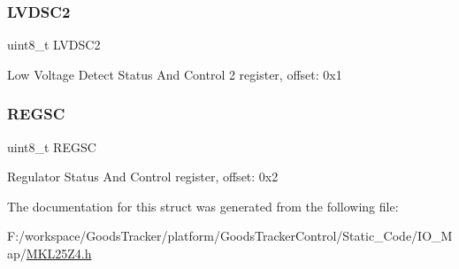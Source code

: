 \subsubsection{\texorpdfstring{L\+V\+D\+S\+C2}{LVDSC2}}
{\footnotesize\ttfamily uint8\+\_\+t L\+V\+D\+S\+C2}

Low Voltage Detect Status And Control 2 register, offset\+: 0x1 \mbox{\label{struct_p_m_c___mem_map_a9786fdb50c1bad04aedb8b090e2eaddf}} 
\subsubsection{\texorpdfstring{R\+E\+G\+SC}{REGSC}}
{\footnotesize\ttfamily uint8\+\_\+t R\+E\+G\+SC}

Regulator Status And Control register, offset\+: 0x2 

The documentation for this struct was generated from the following file\+:\begin{DoxyCompactItemize}
\item 
F\+:/workspace/\+Goods\+Tracker/platform/\+Goods\+Tracker\+Control/\+Static\+\_\+\+Code/\+I\+O\+\_\+\+Map/\hyperlink{_m_k_l25_z4_8h}{M\+K\+L25\+Z4.\+h}\end{DoxyCompactItemize}

